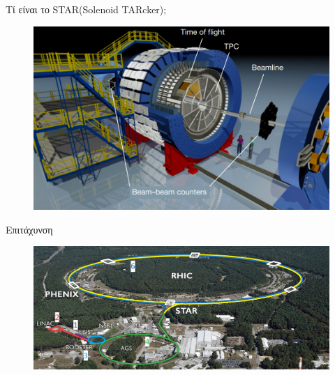 \documentclass[18pt,notheorems,hyperref={pdfauthor=whatever}]{beamer}
\begin{document}
\begin{frame}{Τί είναι το STAR(Solenoid TARcker);}
    \begin{figure}
        \centering
        \includegraphics[scale=0.6]{images/STAR.png}
    \end{figure}
\end{frame}




\begin{frame}{Επιτάχυνση}
    \begin{figure}[h!]
        \centering
        \includegraphics[scale=0.5]{images/written.jpg}
    \end{figure}
\end{frame}
\end{document}
